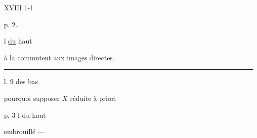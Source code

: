 \uline{$\overline{\mathrm{XVIII}}$} 1-1

p. 2.

 l  \uline{du} haut

 à la  commutent aux images directes.

\margin{\unsure{$>$}}

\par\noindent\rule{.9\linewidth}{.2pt}

 l. 9 des bas

\margin{!} pourquoi supposer $X$ réduite à priori 

 p. 3 l  du haut

embrouillé ---
